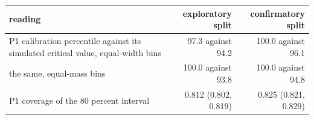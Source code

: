 \begin{tabular}{p{7.4cm}rr}
\toprule
reading & exploratory split & confirmatory split \\
\midrule
P1 calibration percentile against its simulated critical value, equal-width bins & 97.3 against 94.2 & 100.0 against 96.1 \\
\quad the same, equal-mass bins & 100.0 against 93.8 & 100.0 against 94.8 \\
P1 coverage of the 80 percent interval & 0.812 (0.802, 0.819) & 0.825 (0.821, 0.829) \\

\end{tabular}
